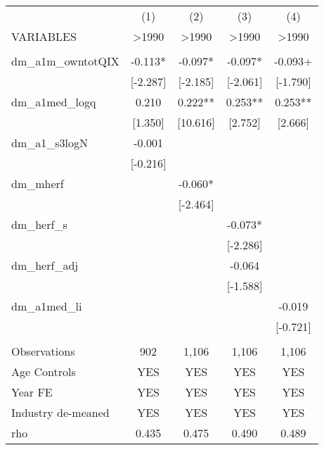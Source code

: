 \documentclass[]{article}
\begin{document}
\begin{tabular}{lcccc} \hline
 & (1) & (2) & (3) & (4) \\
VARIABLES & >1990 & >1990 & >1990 & >1990 \\ \hline
 &  &  &  &  \\
dm\_a1m\_owntotQIX & -0.113* & -0.097* & -0.097* & -0.093+ \\
 & [-2.287] & [-2.185] & [-2.061] & [-1.790] \\
dm\_a1med\_logq & 0.210 & 0.222** & 0.253** & 0.253** \\
 & [1.350] & [10.616] & [2.752] & [2.666] \\
dm\_a1\_s3logN & -0.001 &  &  &  \\
 & [-0.216] &  &  &  \\
dm\_mherf &  & -0.060* &  &  \\
 &  & [-2.464] &  &  \\
dm\_herf\_s &  &  & -0.073* &  \\
 &  &  & [-2.286] &  \\
dm\_herf\_adj &  &  & -0.064 &  \\
 &  &  & [-1.588] &  \\
dm\_a1med\_li &  &  &  & -0.019 \\
 &  &  &  & [-0.721] \\
 &  &  &  &  \\
Observations & 902 & 1,106 & 1,106 & 1,106 \\
Age Controls & YES & YES & YES & YES \\
Year FE & YES & YES & YES & YES \\
Industry de-meaned & YES & YES & YES & YES \\
 rho & 0.435 & 0.475 & 0.490 & 0.489 \\ \hline
\end{tabular}
\end{document}
